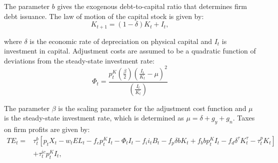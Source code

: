 \noindent\noindent  The parameter $b$ gives the exogenous debt-to-capital ratio that determines firm debt issuance. The law of motion of the capital stock is given by:
\begin{equation}
\label{eqn:lom_capital}
K_{t+1}=(1-\delta)K_{t} + I_{t},
\end{equation}

\noindent\noindent where $\delta$ is the economic rate of depreciation on physical capital and $I_{t}$ is investment in capital.  Adjustment costs are assumed to be a quadratic function of deviations from the steady-state investment rate:
\begin{equation}
\label{eqn:adj_cost}
\Phi_{t}=\frac{p^{K}_{t}\left(\frac{\beta}{2}\right)\left(\frac{I_{t}}{K_{t}}-\mu\right)^{2}}{\left(\frac{I_{t}}{K_{t}}\right)}
\end{equation}

\noindent\noindent The parameter $\beta$ is the scaling parameter for the adjustment cost function and $\mu$ is the steady-state investment rate, which is determined as $\mu=\delta+g_{y}+g_{n}$.  Taxes on firm profits are given by:
\begin{equation}
\label{eqn:corp_tax}
\begin{split}
TE_{t}= & \tau^{b}_{t}\left[p_{t}X_{t}-w_{t}EL_{t}-f_{e}p^{K}_{t}I_{t}-\Phi_{t}I_{t}-f_{i}i_{t}B_{t}-f_{p}\delta b K_{t}+f_{b}bp^{K}_{t}I_{t}-f_{d}\delta^{\tau}K^{\tau}_{t}-\tau^{p}_{t}K_{t}\right] \\
& +\tau^{ic}_{t}p^{K}_{t}I_{t},
\end{split}
\end{equation}


